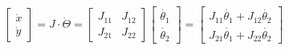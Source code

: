 \begin{equation}
	\begin{bmatrix}
		\dot{x} \\ \dot{y}
 	\end{bmatrix} = J \cdot \dot{\Theta} =\begin{bmatrix}
 	J_{11} & J_{12} \\ J_{21} & J_{22}
 \end{bmatrix}
 	\begin{bmatrix}
 		\dot{\theta_1} \\ \dot{\theta_2}
 	\end{bmatrix} = 
 \begin{bmatrix}
 	J_{11}\dot{\theta_1} + J_{12}\dot{\theta_2} \\
 	J_{21}\dot{\theta_1} + J_{22}\dot{\theta_2}
 \end{bmatrix}
\end{equation}
